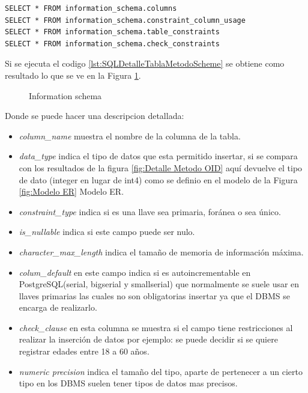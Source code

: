 \lstset{language=sql,breaklines=true}
\begin{lstlisting}
SELECT * FROM information_schema.columns
SELECT * FROM information_schema.constraint_column_usage
SELECT * FROM information_schema.table_constraints
SELECT * FROM information_schema.check_constraints
\end{lstlisting}
Si se ejecuta el codigo \ref{lst:SQLDetalleTablaMetodoScheme} se obtiene como resultado lo que se ve en la Figura \ref{fig:DetalleMetodoScheme}.

\begin{figure}[H]
\centering
{}
\caption{Information schema} \label{fig:DetalleMetodoScheme}
\end{figure}
Donde se puede hacer una descripcion detallada:
\begin{itemize}
\item \emph{column\_name} muestra el nombre de la columna de la tabla.
\item \emph{data\_type} indica el tipo de datos que esta permitido insertar, si se compara con los resultados de la figura \ref{fig:Detalle Metodo OID} aqu\'i devuelve el tipo de dato (integer en lugar de int4) como se definio en el modelo de la Figura \ref{fig:Modelo ER} Modelo ER.
\item \emph{constraint\_type} indica si es una llave sea primaria, for\'anea o sea \'unico.
\item \emph{is\_nullable} indica si este campo puede ser nulo.
\item \emph{character\_max\_length} indica el tama\~no de memoria de informaci\'on m\'axima.
\item \emph{colum\_default} en este campo indica si es autoincrementable en PostgreSQL(serial, bigserial y smallserial) que normalmente se suele usar en llaves primarias las cuales no son obligatorias insertar ya que el DBMS se encarga de realizarlo.
\item \emph{check\_clause} en esta columna se muestra si el campo tiene restricciones al realizar la inserci\'on de datos por ejemplo: se puede decidir si se quiere registrar edades entre 18 a 60 a\~nos. 
\item \emph{numeric precision} indica el tama\~no del tipo, aparte de pertenecer a un cierto tipo en los DBMS suelen tener tipos de datos mas precisos.  
\end{itemize}
